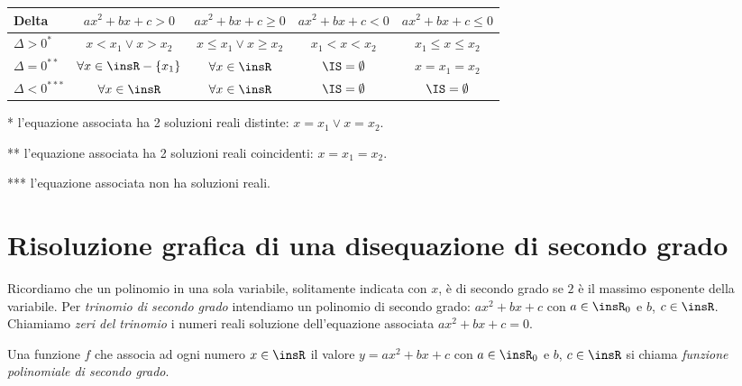 \begin{center}
\begin{threeparttable}
\begin{tabular}{lcccc}
\toprule
Delta & $ax^2+bx+c>0$& $ax^2+bx+c\ge0$& $ax^2+bx+c<0$ & $ax^2+bx+c\le0$\\
\midrule
 $\Delta >0^{*}$& $ x<x_1\vee x>x_2 $ & $ x\le x_1\vee x\ge x_2 $& $ x_1<x<x_2 $&$ x_1\le x\le x_2 $\\
$\Delta =0^{**}$& $\forall x\in \insR-\{x_1\} $ & $ \forall x\in \insR $& $ \IS=\emptyset $&$ x=x_1=x_2 $\\
$\Delta <0^{***}$&$ \forall x\in \insR $ & $ \forall x\in \insR $& $ \IS=\emptyset $&$ \IS=\emptyset $\\
\bottomrule
\end{tabular}
\begin{tablenotes}
\item [*] l'equazione associata ha 2 soluzioni reali distinte: $x=x_1\vee x=x_2$.
\item [**] l'equazione associata ha 2 soluzioni reali coincidenti: $x=x_1=x_2$.
\item [***] l'equazione associata non ha soluzioni reali.
\end{tablenotes}
\end{threeparttable}
\end{center}

\vspazio\ovalbox{\risolvii \ref{ese:4.1}, \ref{ese:4.2}, \ref{ese:4.3}, \ref{ese:4.4}, \ref{ese:4.5}, \ref{ese:4.6}}

\section{Risoluzione grafica di una disequazione di secondo grado}

Ricordiamo che un polinomio in una sola variabile, solitamente indicata con $x$, è di secondo grado se $2$ è il massimo esponente della variabile. Per \emph{trinomio di secondo grado} intendiamo un polinomio di secondo grado: $ax^2+bx+c$ con $a\in \insR_{0}$ e $b$, $c\in \insR$. Chiamiamo \emph{zeri del trinomio} i numeri reali soluzione dell'equazione associata $ax^2+bx+c=0$.

\begin{definizione}
Una funzione $f$ che associa ad ogni numero $x\in \insR$ il valore $y=ax^2+bx+c$ con $a\in \insR_{0}$ e $b$, $c\in \insR$ si chiama \emph{funzione polinomiale di secondo grado}.
\end{definizione}

